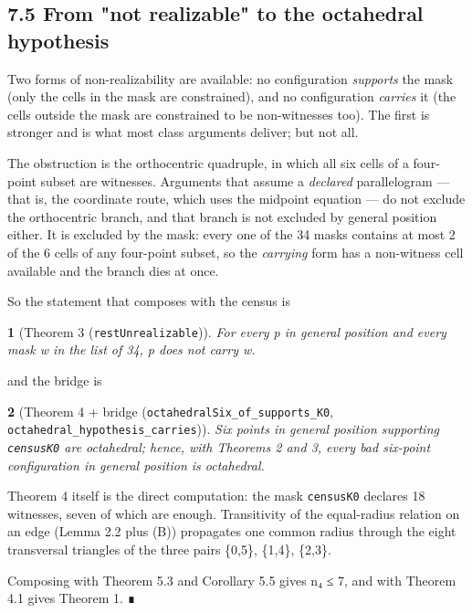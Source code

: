 \documentclass[11pt,a4paper]{article}
\theoremstyle{named}
\newtheorem*{namedthm}{}
\begin{document}
\subsection*{7.5 From "not realizable" to the octahedral hypothesis}

Two forms of non-realizability are available: no configuration \textit{supports} the mask (only the cells in the mask are constrained), and no configuration \textit{carries} it (the cells outside the mask are constrained to be non-witnesses too). The first is stronger and is what most class arguments deliver; but not all.

The obstruction is the orthocentric quadruple, in which all six cells of a four-point subset are witnesses. Arguments that assume a \textit{declared} parallelogram — that is, the coordinate route, which uses the midpoint equation — do not exclude the orthocentric branch, and that branch is not excluded by general position either. It is excluded by the mask: every one of the 34 masks contains at most 2 of the 6 cells of any four-point subset, so the \textit{carrying} form has a non-witness cell available and the branch dies at once.

So the statement that composes with the census is

\begin{namedthm}[Theorem 3 (\texttt{restUnrealizable})]
For every p in general position and every mask w in the list of 34, p does not carry w.
\end{namedthm}

and the bridge is

\begin{namedthm}[Theorem 4 + bridge (\texttt{octahedralSix\_\allowbreak{}of\_\allowbreak{}supports\_\allowbreak{}K0}, \texttt{octahedral\_\allowbreak{}hypothesis\_\allowbreak{}carries})]
Six points in general position supporting \texttt{censusK0} are octahedral; hence, with Theorems 2 and 3, every bad six-point configuration in general position is octahedral.
\end{namedthm}

Theorem 4 itself is the direct computation: the mask \texttt{censusK0} declares 18 witnesses, seven of which are enough. Transitivity of the equal-radius relation on an edge (Lemma 2.2 plus (B)) propagates one common radius through the eight transversal triangles of the three pairs \{0,5\}, \{1,4\}, \{2,3\}.

Composing with Theorem 5.3 and Corollary 5.5 gives n₄ ≤ 7, and with Theorem 4.1 gives Theorem 1. ∎
\end{document}
